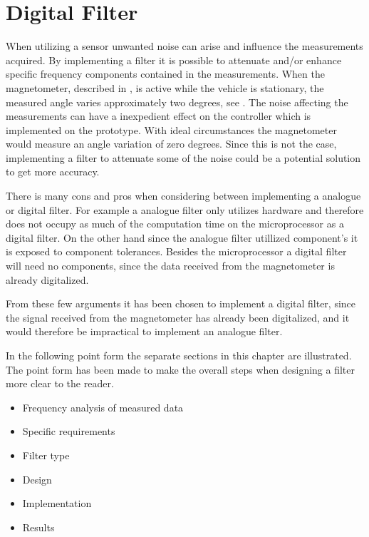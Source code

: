 \chapter{Digital Filter}

When utilizing a sensor unwanted noise can arise and influence the measurements acquired. By implementing a filter it is possible to attenuate and/or enhance specific frequency components contained in the measurements. When the magnetometer, described in , is active while the vehicle is stationary, the measured angle varies approximately two degrees, see . The noise affecting the measurements can have a inexpedient effect on the controller which is implemented on the prototype. With ideal circumstances the magnetometer would measure an angle variation of zero degrees. Since this is not the case, implementing a filter to attenuate some of the noise could be a potential solution to get more accuracy.

There is many cons and pros when considering between implementing a analogue or digital filter. For example a analogue filter only utilizes hardware and therefore does not occupy as much of the computation time on the microprocessor as a digital filter. On the other hand since the analogue filter utillized component's it is exposed to component tolerances. Besides the microprocessor a digital filter will need no components, since the data received from the magnetometer is already digitalized.

From these few arguments it has been chosen to implement a digital filter, since the signal received from the magnetometer has already been digitalized, and it would therefore be impractical to implement an analogue filter.

In the following point form the separate sections in this chapter are illustrated. The point form has been made to make the overall steps when designing a filter more clear to the reader.

\begin{itemize}
\item Frequency analysis of measured data
\item Specific requirements
\item Filter type
\item Design
\item Implementation
\item Results
\end{itemize}

